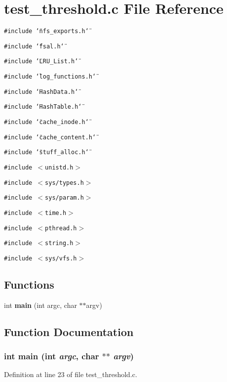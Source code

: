 \section{test\_\-threshold.c File Reference}
\label{test__threshold_8c}
{\tt \#include \char`\"{}nfs\_\-exports.h\char`\"{}}\par
{\tt \#include \char`\"{}fsal.h\char`\"{}}\par
{\tt \#include \char`\"{}LRU\_\-List.h\char`\"{}}\par
{\tt \#include \char`\"{}log\_\-functions.h\char`\"{}}\par
{\tt \#include \char`\"{}HashData.h\char`\"{}}\par
{\tt \#include \char`\"{}HashTable.h\char`\"{}}\par
{\tt \#include \char`\"{}cache\_\-inode.h\char`\"{}}\par
{\tt \#include \char`\"{}cache\_\-content.h\char`\"{}}\par
{\tt \#include \char`\"{}stuff\_\-alloc.h\char`\"{}}\par
{\tt \#include $<$unistd.h$>$}\par
{\tt \#include $<$sys/types.h$>$}\par
{\tt \#include $<$sys/param.h$>$}\par
{\tt \#include $<$time.h$>$}\par
{\tt \#include $<$pthread.h$>$}\par
{\tt \#include $<$string.h$>$}\par
{\tt \#include $<$sys/vfs.h$>$}\par
\subsection*{Functions}
\begin{CompactItemize}
\item 
int {\bf main} (int argc, char $\ast$$\ast$argv)
\end{CompactItemize}


\subsection{Function Documentation}
\subsubsection[{main}]{\setlength{\rightskip}{0pt plus 5cm}int main (int {\em argc}, \/  char $\ast$$\ast$ {\em argv})}\label{test__threshold_8c_3c04138a5bfe5d72780bb7e82a18e627}




Definition at line 23 of file test\_\-threshold.c.